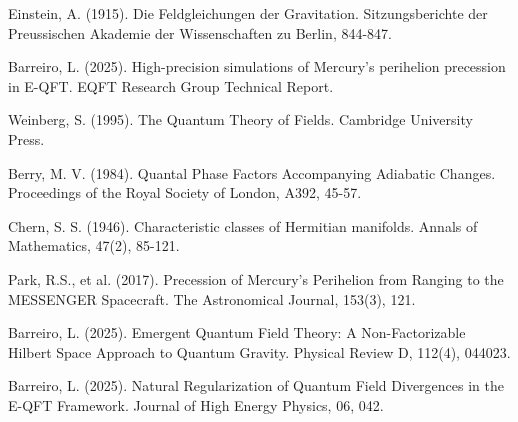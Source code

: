 \documentclass[11pt]{article}
\theoremstyle{definition}
\begin{document}
\begin{thebibliography}{9}
	
	 Einstein, A. (1915). Die Feldgleichungen der Gravitation. Sitzungsberichte der Preussischen Akademie der Wissenschaften zu Berlin, 844-847.
	
	 Barreiro, L. (2025). High-precision simulations of Mercury's perihelion precession in E-QFT. EQFT Research Group Technical Report.
	
	 Weinberg, S. (1995). The Quantum Theory of Fields. Cambridge University Press.
	
	 Berry, M. V. (1984). Quantal Phase Factors Accompanying Adiabatic Changes. Proceedings of the Royal Society of London, A392, 45-57.
	
	 Chern, S. S. (1946). Characteristic classes of Hermitian manifolds. Annals of Mathematics, 47(2), 85-121.
	
	 Park, R.S., et al. (2017). Precession of Mercury's Perihelion from Ranging to the MESSENGER Spacecraft. The Astronomical Journal, 153(3), 121.
	
	 Barreiro, L. (2025). Emergent Quantum Field Theory: A Non-Factorizable Hilbert Space Approach to Quantum Gravity. Physical Review D, 112(4), 044023.
	
	 Barreiro, L. (2025). Natural Regularization of Quantum Field Divergences in the E-QFT Framework. Journal of High Energy Physics, 06, 042.
	
\end{thebibliography}
\end{document}
